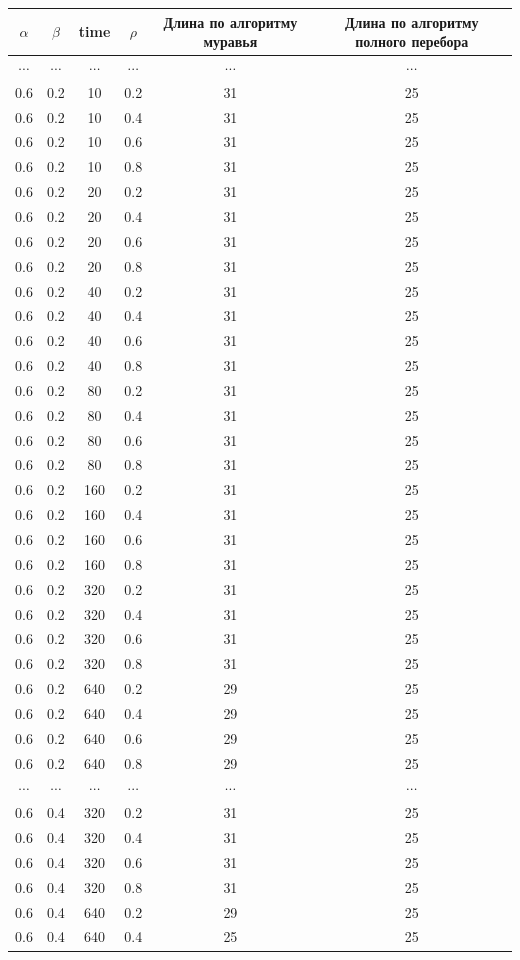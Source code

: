 \documentclass[a4paper,14pt]{article} %
\begin{document}
\begin{tabular}{|c|c|c|c|c|c|}
\hline
$\alpha$&$\beta$&time&$\rho$&Длина по алгоритму муравья&Длина по алгоритму полного перебора \\
		\hline	

$\cdots$&$\cdots$&$\cdots$&$\cdots$&$\cdots$&$\cdots$\\
0.6&0.2&10&0.2&31&25\\
0.6&0.2&10&0.4&31&25\\
0.6&0.2&10&0.6&31&25\\
0.6&0.2&10&0.8&31&25\\
0.6&0.2&20&0.2&31&25\\
0.6&0.2&20&0.4&31&25\\
0.6&0.2&20&0.6&31&25\\
0.6&0.2&20&0.8&31&25\\
0.6&0.2&40&0.2&31&25\\
0.6&0.2&40&0.4&31&25\\
0.6&0.2&40&0.6&31&25\\
0.6&0.2&40&0.8&31&25\\
0.6&0.2&80&0.2&31&25\\
0.6&0.2&80&0.4&31&25\\
0.6&0.2&80&0.6&31&25\\
0.6&0.2&80&0.8&31&25\\
0.6&0.2&160&0.2&31&25\\
0.6&0.2&160&0.4&31&25\\
0.6&0.2&160&0.6&31&25\\
0.6&0.2&160&0.8&31&25\\
0.6&0.2&320&0.2&31&25\\
0.6&0.2&320&0.4&31&25\\
0.6&0.2&320&0.6&31&25\\
0.6&0.2&320&0.8&31&25\\
0.6&0.2&640&0.2&29&25\\
0.6&0.2&640&0.4&29&25\\
0.6&0.2&640&0.6&29&25\\
0.6&0.2&640&0.8&29&25\\
$\cdots$&$\cdots$&$\cdots$&$\cdots$&$\cdots$&$\cdots$\\
0.6&0.4&320&0.2&31&25\\
0.6&0.4&320&0.4&31&25\\
0.6&0.4&320&0.6&31&25\\
0.6&0.4&320&0.8&31&25\\
0.6&0.4&640&0.2&29&25\\
0.6&0.4&640&0.4&25&25\\

\end{tabular}
\end{document}

